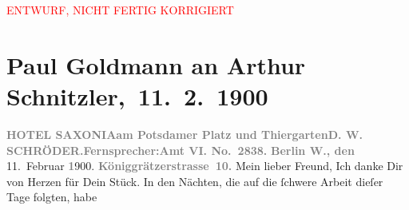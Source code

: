 
\begin{center}
            \textcolor{red}{ENTWURF, NICHT FERTIG KORRIGIERT}
                      \end{center}
            
         
         \renewcommand{\erwaehntePersonen}{Personen: Cesare Borgia, Gerhart Hauptmann, D. W. Schröder, William Shakespeare}
         \renewcommand{\erwaehnteOrte}{Orte: Berlin, Bologna, Deutsches Theater Berlin, Hotel Saxonia, Potsdamer Platz, Stresemannstraße, Tiergarten, Wien}
         \renewcommand{\erwaehnteWerke}{Werke: Der Schleier der Beatrice. Schauspiel in fünf Akten, Schluck und Jau}
               \section[ Paul Goldmann an Arthur Schnitzler, 11. 2. 1900]{ Paul Goldmann an Arthur Schnitzler, 11. 2. 1900}\nopagebreak{}\rehead{ }\begin{ledgroupsized}[t]{13cm}\normalsize\beginnumbering \toendnotes[C]{\smallbreak\pagebreak[2]} 
\toendnotes[C]{\smallbreak}\pstart{}{\pb}\textcolor{gray}{\textbf{\textbf{HOTEL SAXONIA}}}\pend{}\pstart{}\textcolor{gray}{\textbf{am Potsdamer Platz und
                        Thiergarten}}\pend{}\pstart{}\textcolor{gray}{\textbf{D. W. SCHRÖDER.}}\pend{}\pstart{}\textcolor{gray}{\textbf{Fernsprecher:}}\pend{}\pstart{}\textcolor{gray}{\textbf{\textbf{Amt VI. No. 2838.}}}\pend{}{\bigskip}\pstart
           \raggedleft{}\textcolor{gray}{\textbf{Berlin W., den}}{ }11. Februar \textcolor{gray}{\textbf{1}}900. \textcolor{gray}{\textbf{Königgrätzerstrasse 10.}}\pend
           \pstart{}Mein lieber Freund,\pend\pstart
           Ich danke Dir von Herzen für Dein Stück. In den Nächten, die auf die ſchwere Arbeit dieſer Tage folgten, habe

\end{ledgroupsized}
